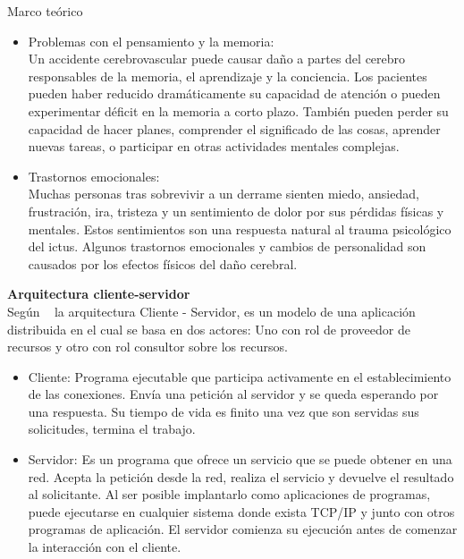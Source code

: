 \begin{thesischapter}{1} {Marco teórico}
\begin{itemize}
\begin{itemize}
            \item afasia global , en la que las personas pierden casi todas sus habilidades lingüísticas; no pueden entender el lenguaje o usarlo para transmitir pensamientos.  
        \end{itemize}
        \item Problemas con el pensamiento y la memoria:\\
        Un accidente cerebrovascular puede causar daño a partes del cerebro responsables
        de la memoria, el aprendizaje y la conciencia. Los pacientes pueden haber reducido
        dramáticamente su capacidad de atención o pueden experimentar déficit en la memoria a
        corto plazo. También pueden perder su capacidad de hacer planes, comprender el
        significado de las cosas, aprender nuevas tareas, o participar en otras actividades mentales
        complejas.~\cite{post-strok}
        \item Trastornos emocionales:\\
        Muchas personas tras sobrevivir a un derrame sienten miedo, ansiedad,
        frustración, ira, tristeza y un sentimiento de dolor por sus pérdidas físicas y mentales.
        Estos sentimientos son una respuesta natural al trauma psicológico del ictus. Algunos
        trastornos emocionales y cambios de personalidad son causados por los efectos físicos
        del daño cerebral.~\cite{post-strok} 
    \end{itemize}
    

    \vspace{10pt}
    \textbf{Arquitectura cliente-servidor}\\
    Según ~\cite{moyano2020arquitectura} la arquitectura Cliente - Servidor, es 
    un modelo de una aplicación distribuida en el cual se basa en dos actores:
    Uno con rol de proveedor de recursos y otro con rol consultor sobre los recursos.
    \begin{itemize}
        \item Cliente: Programa ejecutable que participa activamente en el establecimiento de las conexiones. Envía una petición al servidor y se queda
        esperando por una respuesta. Su tiempo de vida es finito una vez que son
        servidas sus solicitudes, termina el trabajo.
        \item Servidor: Es un programa que ofrece un servicio que se puede obtener
        en una red. Acepta la petición desde la red, realiza el servicio y devuelve
        el resultado al solicitante. Al ser posible implantarlo como aplicaciones de
        programas, puede ejecutarse en cualquier sistema donde exista TCP/IP y
        junto con otros programas de aplicación. El servidor comienza su ejecución
        antes de comenzar la interacción con el cliente.
    \end{itemize}


\end{thesischapter}
